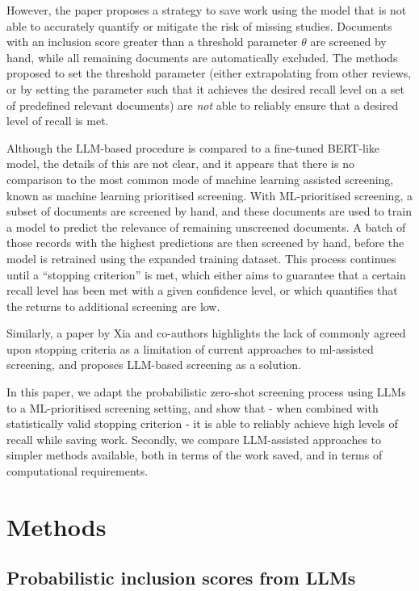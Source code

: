 \documentclass{article}
\begin{document}
	However, the paper proposes a strategy to save work using the model that is not able to accurately quantify or mitigate the risk of missing studies. Documents with an inclusion score greater than a threshold parameter $\theta$ are screened by hand, while all remaining documents are automatically excluded. The methods proposed to set the threshold parameter (either extrapolating from other reviews, or by setting the parameter such that it achieves the desired recall level on a set of predefined relevant documents) are \textit{not} able to reliably ensure that a desired level of recall is met. 
	
	Although the LLM-based procedure is compared to a fine-tuned BERT-like model, the details of this are not clear, and it appears that there is no comparison to the most common mode of machine learning assisted screening, known as machine learning prioritised screening. With ML-prioritised screening, a subset of documents are screened by hand, and these documents are used to train a model to predict the relevance of remaining unscreened documents. A batch of those records with the highest predictions are then screened by hand, before the model is retrained using the expanded training dataset. This process continues until a ``stopping criterion'' \cite{SneydS19, callaghan_statistical_2020, lewis_confidence_2023} is met, which either aims to guarantee that a certain recall level has been met with a given confidence level, or which quantifies that the returns to additional screening are low. 

    Similarly, a paper by Xia and co-authors \cite{xia_llmscreen_2024} highlights the lack of commonly agreed upon stopping criteria as a limitation of current approaches to ml-assisted screening, and proposes LLM-based screening as a solution.
	
	In this paper, we adapt the probabilistic zero-shot screening process using LLMs to a ML-prioritised screening setting, and show that - when combined with statistically valid stopping criterion - it is able to reliably achieve high levels of recall while saving work. Secondly, we compare LLM-assisted approaches to simpler methods available, both in terms of the work saved, and in terms of computational requirements.
	
	\section*{Methods}
	
	\subsection*{Probabilistic inclusion scores from LLMs}
	
\end{document}
